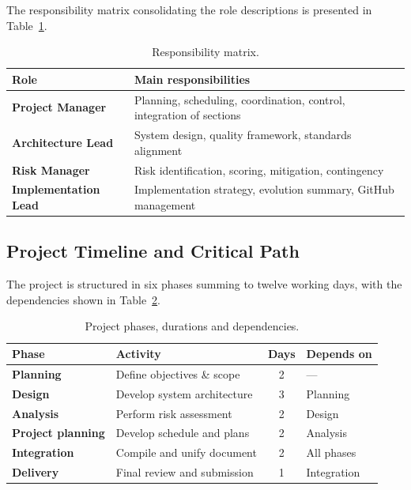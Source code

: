 \documentclass[conference,a4paper,10pt]{IEEEtran}
\begin{document}
The responsibility matrix consolidating the role descriptions is presented
in Table~\ref{tab:resp}.

\begin{table}[H]
\centering
\caption{Responsibility matrix.}
\label{tab:resp}
\renewcommand{\arraystretch}{1.2}
\footnotesize
\begin{tabularx}{\columnwidth}{>{\bfseries}lX}
\toprule
\rowcolor{tableheader} Role & Main responsibilities \\
\midrule
Project Manager      & Planning, scheduling, coordination, control, integration of sections \\
Architecture Lead    & System design, quality framework, standards alignment \\
Risk Manager         & Risk identification, scoring, mitigation, contingency \\
Implementation Lead  & Implementation strategy, evolution summary, GitHub management \\
\bottomrule
\end{tabularx}
\end{table}

\subsection{Project Timeline and Critical Path}

The project is structured in six phases summing to twelve working days, with
the dependencies shown in Table~\ref{tab:timeline}.

\begin{table}[H]
\centering
\caption{Project phases, durations and dependencies.}
\label{tab:timeline}
\renewcommand{\arraystretch}{1.2}
\footnotesize
\begin{tabularx}{\columnwidth}{>{\bfseries}l X c l}
\toprule
\rowcolor{tableheader} Phase & Activity & Days & Depends on \\
\midrule
Planning         & Define objectives \& scope          & 2 & --- \\
Design           & Develop system architecture         & 3 & Planning \\
Analysis         & Perform risk assessment             & 2 & Design \\
Project planning & Develop schedule and plans          & 2 & Analysis \\
Integration      & Compile and unify document          & 2 & All phases \\
Delivery         & Final review and submission         & 1 & Integration \\
\bottomrule
\end{tabularx}
\end{table}
\end{document}
